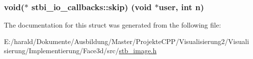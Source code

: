 \subsubsection[{\texorpdfstring{skip}{skip}}]{\setlength{\rightskip}{0pt plus 5cm}void($\ast$ stbi\+\_\+io\+\_\+callbacks\+::skip) (void $\ast$user, int n)}\hypertarget{structstbi__io__callbacks_a257aac5480a90a6c4b8fbe86c1b01068}{}\label{structstbi__io__callbacks_a257aac5480a90a6c4b8fbe86c1b01068}


The documentation for this struct was generated from the following file\+:\begin{DoxyCompactItemize}
\item 
E\+:/harald/\+Dokumente/\+Ausbildung/\+Master/\+Projekte\+C\+P\+P/\+Visualisierung2/\+Visualisierung/\+Implementierung/\+Face3d/src/\hyperlink{stb__image_8h}{stb\+\_\+image.\+h}\end{DoxyCompactItemize}
